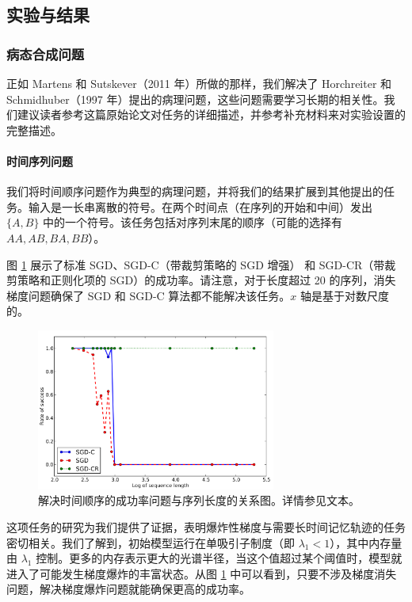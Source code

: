 \subsection{实验与结果}\label{4-ux5b9eux9a8cux4e0eux7ed3ux679c}

\subsubsection{病态合成问题}\label{41-ux75c5ux6001ux5408ux6210ux95eeux9898}

正如 Martens 和 Sutskever（2011 年）所做的那样，我们解决了 Horchreiter 和 Schmidhuber（1997 年）提出的病理问题，这些问题需要学习长期的相关性。我们建议读者参考这篇原始论文对任务的详细描述，并参考补充材料来对实验设置的完整描述。

\paragraph{时间序列问题}\label{411-ux65f6ux95f4ux5e8fux5217ux95eeux9898}

我们将时间顺序问题作为典型的病理问题，并将我们的结果扩展到其他提出的任务。输入是一长串离散的符号。在两个时间点（在序列的开始和中间）发出 \(\{A,B\}\) 中的一个符号。该任务包括对序列末尾的顺序（可能的选择有 \(AA, AB, BA, BB\)）。

图 \ref{fig:time} 展示了标准 SGD、SGD-C（带裁剪策略的 SGD 增强） 和 SGD-CR（带裁剪策略和正则化项的 SGD）的成功率。请注意，对于长度超过 20 的序列，消失梯度问题确保了 SGD 和 SGD-C 算法都不能解决该任务。\(x\) 轴是基于对数尺度的。

\begin{figure}[htbp]
  \centering
  \includegraphics[width=0.7\textwidth]{figures/IMG_739B2EF41C1E-1.jpeg}
  \caption{解决时间顺序的成功率问题与序列长度的关系图。详情参见文本。}
  \label{fig:time}
\end{figure}

这项任务的研究为我们提供了证据，表明爆炸性梯度与需要长时间记忆轨迹的任务密切相关。我们了解到，初始模型运行在单吸引子制度（即 \(\lambda_1 < 1\)），其中内存量由 \(\lambda_1\) 控制。更多的内存表示更大的光谱半径，当这个值超过某个阈值时，模型就进入了可能发生梯度爆炸的丰富状态。从图 \ref{fig:time} 中可以看到，只要不涉及梯度消失问题，解决梯度爆炸问题就能确保更高的成功率。

